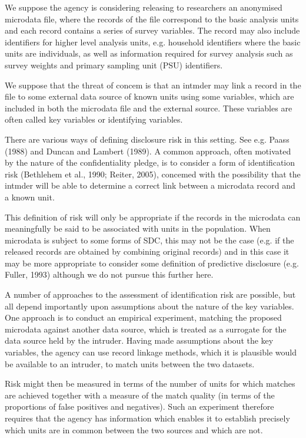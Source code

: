 We suppose the agency is considering releasing to researchers an anonymised
microdata file, where the records of the file correspond to the basic analysis units and
each record contains a series of survey variables. The record may also include identifiers
for higher level analysis units, e.g. household identifiers where the basic units are
individuals, as well as information required for survey analysis such as survey weights
and primary sampling unit (PSU) identiﬁers.

We suppose that the threat of concem is that an intmder may link a record in the file
to some external data source of known units using some variables, which are included in
both the microdata file and the external source. These variables are often called key
variables or identifying variables. 

There are various ways of defining disclosure risk in
this setting. See e.g. Paass (1988) and Duncan and Lambert (1989). A common approach,
often motivated by the nature of the confidentiality pledge, is to consider a form of
identification risk (Bethlehem et al., 1990; Reiter, 2005), concemed with the possibility
that the intmder will be able to determine a correct link between a microdata record and a
known unit. 

This definition of risk will only be appropriate if the records in the microdata
can meaningfully be said to be associated with units in the population. When microdata is
subject to some forms of SDC, this may not be the case (e.g. if the released records are
obtained by combining original records) and in this case it may be more appropriate to
consider some deﬁnition of predictive disclosure (e.g. Fuller, 1993) although we do not
pursue this further here.

A number of approaches to the assessment of identification risk are possible, but all
depend importantly upon assumptions about the nature of the key variables. One
approach is to conduct an empirical experiment, matching the proposed microdata against
another data source, which is treated as a surrogate for the data source held by the
intruder. Having made assumptions about the key variables, the agency can use record
linkage methods, which it is plausible would be available to an intruder, to match units
between the two datasets. 

Risk might then be measured in terms of the number of units
for which matches are achieved together with a measure of the match quality (in terms of
the proportions of false positives and negatives). Such an experiment therefore requires
that the agency has information which enables it to establish precisely which units are in
common between the two sources and which are not.

